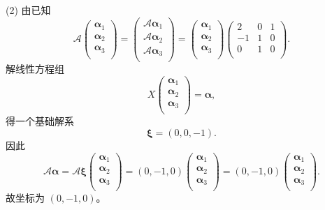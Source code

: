 \begin{enumerate}[1~]
\begin{solution}
(2) 由已知\[
\mathscr{A} \left( \begin{array}{c}
	\boldsymbol{\alpha} _1\\
	\boldsymbol{\alpha} _2\\
	\boldsymbol{\alpha} _3\\
\end{array} \right) = \left( \begin{array}{c}
	\mathscr{A}\boldsymbol{\alpha} _1\\
	\mathscr{A}\boldsymbol{\alpha} _2\\
	\mathscr{A}\boldsymbol{\alpha} _3\\
\end{array} \right) =\left( \begin{array}{c}
	\boldsymbol{\alpha} _1\\
	\boldsymbol{\alpha} _2\\
	\boldsymbol{\alpha} _3\\
\end{array} \right) \left( \begin{matrix}
	2&		0&		1\\
	-1&		1&		0\\
	0&		1&		0\\
\end{matrix} \right) .
\]
解线性方程组 
$$
X \left( \begin{array}{c}
	\boldsymbol{\alpha} _1\\
	\boldsymbol{\alpha} _2\\
	\boldsymbol{\alpha} _3\\
\end{array} \right) = \boldsymbol{\alpha},
$$
得一个基础解系
$$
\boldsymbol{\xi}=(0,0,-1).
$$
因此
$$
\mathscr{A}\boldsymbol{\alpha}=\mathscr{A} \boldsymbol{\xi} \left( \begin{array}{c}
	\boldsymbol{\alpha} _1\\
	\boldsymbol{\alpha} _2\\
	\boldsymbol{\alpha} _3\\
\end{array} \right) = ( 0,-1,0 ) \left( \begin{array}{c}
	\boldsymbol{\alpha} _1\\
	\boldsymbol{\alpha} _2\\
	\boldsymbol{\alpha} _3\\
\end{array} \right) = ( 0,-1,0 ) \left( \begin{array}{c}
	\boldsymbol{\alpha} _1\\
	\boldsymbol{\alpha} _2\\
	\boldsymbol{\alpha} _3\\
\end{array} \right).
$$
故坐标为 $(0,-1,0)$。


\end{solution}
\end{enumerate}
